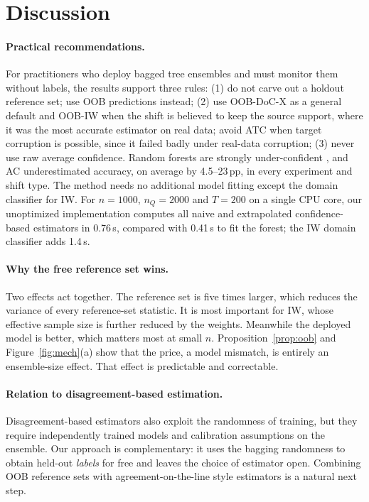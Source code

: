 \section{Discussion}
\label{sec:discussion}

\paragraph{Practical recommendations.}
For practitioners who deploy bagged tree ensembles and must monitor them without labels, the results support three rules:
(1) do not carve out a holdout reference set; use OOB predictions instead;
(2) use OOB-DoC-X as a general default and OOB-IW when the shift is believed to keep the source support, where it was the most accurate estimator on real data; avoid ATC when target corruption is possible, since it failed badly under real-data corruption;
(3) never use raw average confidence. Random forests are strongly under-confident \citep{niculescu2005probs}, and AC underestimated accuracy, on average by 4.5--23\,pp, in every experiment and shift type.
The method needs no additional model fitting except the domain classifier for IW. For $n=1000$, $n_Q=2000$ and $T=200$ on a single CPU core, our unoptimized implementation computes all naive and extrapolated confidence-based estimators in 0.76\,s, compared with 0.41\,s to fit the forest; the IW domain classifier adds 1.4\,s.

\paragraph{Why the free reference set wins.}
Two effects act together. The reference set is five times larger, which reduces the variance of every reference-set statistic. It is most important for IW, whose effective sample size is further reduced by the weights. Meanwhile the deployed model is better, which matters most at small $n$. Proposition~\ref{prop:oob} and Figure~\ref{fig:mech}(a) show that the price, a model mismatch, is entirely an ensemble-size effect. That effect is predictable and correctable.

\paragraph{Relation to disagreement-based estimation.}
Disagreement-based estimators \citep{jiang2022gde,baek2022aotl} also exploit the randomness of training, but they require independently trained models and calibration assumptions on the ensemble. Our approach is complementary: it uses the bagging randomness to obtain held-out \emph{labels} for free and leaves the choice of estimator open. Combining OOB reference sets with agreement-on-the-line style estimators is a natural next step.

